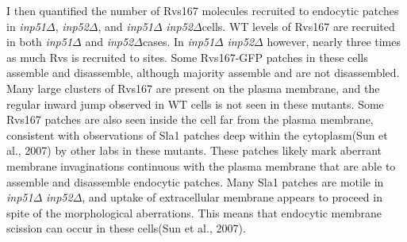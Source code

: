 \vspace{5mm}
I then quantified the number of Rvs167 molecules recruited to endocytic patches in \textit{inp51$\Delta$}, \textit{inp52$\Delta$}, and \textit{inp51$\Delta$} \textit{inp52$\Delta$}cells.  WT levels of Rvs167 are recruited in both \textit{inp51$\Delta$} and \textit{inp52$\Delta$}cases. In \textit{inp51$\Delta$} \textit{inp52$\Delta$} however, nearly three times as much Rvs is recruited to sites. Some Rvs167-GFP patches in these cells assemble and disassemble, although majority assemble and are not disassembled. Many large clusters of Rvs167 are present on the plasma membrane, and the regular inward jump observed in WT cells is not seen in these mutants. Some Rvs167 patches are also seen inside the cell far from the plasma membrane, consistent with observations of Sla1 patches deep within the cytoplasm(Sun et al., 2007) by other labs in these mutants. These patches likely mark aberrant membrane invaginations continuous with the plasma membrane that are able to assemble and disassemble endocytic patches. Many Sla1 patches are motile in \textit{inp51$\Delta$} \textit{inp52$\Delta$}, and uptake of extracellular membrane appears to proceed in spite of the morphological aberrations. This means that endocytic membrane scission can occur in these cells(Sun et al., 2007). 




